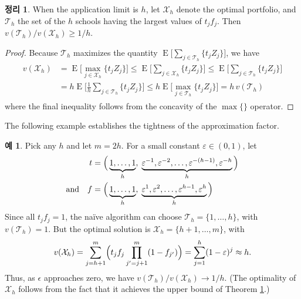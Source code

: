 \documentclass[12pt]{article} %
\newtheorem{theorem}{Theorem}
\theoremstyle{definition}
\newtheorem{example}{Example}
\newtheorem{theorem}{정리}
\theoremstyle{definition}
\newtheorem{example}{예}
\begin{document}
\begin{theorem} \label{oneoverhopt}
When the application limit is $h$, let $\mathcal{X}_h$ denote the optimal portfolio, and $\mathcal{T}_h$ the set of the $h$ schools having the largest values of $t_j f_j$. Then $v(\mathcal{T}_h) / v(\mathcal{X}_h) \geq 1/h$. 
\end{theorem}
\begin{proof}
Because $\mathcal{T}_h$ maximizes the quantity $\operatorname{E}\bigl[ \sum_{j \in \mathcal{T}_h}\{ t_j Z_j \}\bigr]$, we have
\begin{align} \label{oneoverhopt}
\begin{split}
v(\mathcal{X}_h) &= \operatorname{E}\bigl[ \max_{j \in \mathcal{X}_h}\{ t_j Z_j \}\bigr] \leq \operatorname{E}\bigl[ \sum_{j \in \mathcal{X}_h}\{ t_j Z_j \}\bigr] \leq \operatorname{E}\bigl[ \sum_{j \in \mathcal{T}_h}\{ t_j Z_j \}\bigr] \\
&= h  \operatorname{E}\bigl[ \tfrac{1}{h} \sum_{j \in \mathcal{T}_h}\{ t_j Z_j \}\bigr]
\leq h  \operatorname{E}\bigl[ \max_{j \in \mathcal{T}_h}\{ t_j Z_j \}\bigr]
= h\,v(\mathcal{T}_h)
\end{split}
\end{align}
where the final inequality follows from the concavity of the $\max\{\}$ operator.
\end{proof}

The following example establishes the tightness of the approximation factor. 

\begin{example} \label{tightexampleforoneoverhopt}
Pick any $h$ and let $m = 2h$. For a small constant $\varepsilon \in (0, 1)$, let
\begin{align*}
t &= \Bigl(\,\underbrace{1,  \dots, 1}_{h},\;
\underbrace{\varepsilon^{-1}, \varepsilon^{-2}, \dots, \varepsilon^{-(h-1)}, \varepsilon^{-h}}_{h}\,\Bigr) \\
\text{and}\quad f &= \Bigl(\,\underbrace{1,  \dots, 1}_{h},\;
\underbrace{\varepsilon^{1}, \varepsilon^{2}, \dots, \varepsilon^{h-1}, \varepsilon^{h}}_{h}\,\Bigr)
\end{align*}
Since all $t_j f_j = 1$, the na\"ive algorithm can choose $\mathcal{T}_h = \{1, \dots, h\}$, with $v(\mathcal{T}_h) = 1$. But the optimal solution is $\mathcal{X}_h = \{h+1, \dots, m\}$, with
\begin{equation*}
v(\mathcal{X}_h) = \sum_{j= h +1}^m \Bigl( t_j f_j \prod_{j' = j+1}^m (1 - f_{j'}) \Bigr) =  \sum_{j= 1}^h  (1 - \varepsilon)^{j} \approx h.
\end{equation*}
Thus, as $\epsilon$ approaches zero, we have $v(\mathcal{T}_h) / v(\mathcal{X}_h) \to 1/h$. (The optimality of $\mathcal{X}_h$ follows from the fact that it achieves the upper bound of Theorem \ref{oneoverhopt}.)
\end{example}
\end{document}
